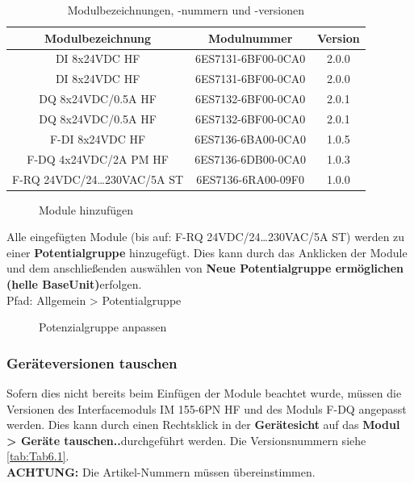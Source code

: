 \begin{table}[H]
    \centering
    \begin{tabular}{|c|c|c|}
        \hline
         \textbf{Modulbezeichnung} & \textbf{Modulnummer} & \textbf{Version} \\
         \hline
         DI 8x24VDC HF	& 6ES7131-6BF00-0CA0	& 2.0.0 \\
         \hline
         DI 8x24VDC HF	& 6ES7131-6BF00-0CA0	& 2.0.0 \\
         \hline
         DQ 8x24VDC/0.5A HF &	6ES7132-6BF00-0CA0	& 2.0.1 \\
         \hline
         DQ 8x24VDC/0.5A HF &	6ES7132-6BF00-0CA0	& 2.0.1 \\
         \hline
         F-DI 8x24VDC HF & 	6ES7136-6BA00-0CA0	& 1.0.5 \\
         \hline
         F-DQ 4x24VDC/2A PM HF & 	6ES7136-6DB00-0CA0	& 1.0.3 \\
         \hline
         F-RQ 24VDC/24…230VAC/5A ST & 	6ES7136-6RA00-09F0	& 1.0.0 \\
         \hline
    \end{tabular}
    \caption{Modulbezeichnungen, -nummern und -versionen}
    \label{tab:Tab6.1}
\end{table}

\begin{figure}[H]
   \centering
   \caption[Module hinzufügen]{Module hinzufügen}
   \label{fig:Bild6.23}
\end{figure}

Alle eingefügten Module (bis auf: F-RQ 24VDC/24…230VAC/5A ST) werden zu einer \textbf{Potentialgruppe} hinzugefügt. Dies kann durch das Anklicken der Module und dem anschließenden auswählen von \glqq\textbf{Neue Potentialgruppe ermöglichen (helle BaseUnit)}\grqq\:erfolgen.\\
Pfad: Allgemein > Potentialgruppe

\begin{figure}[H]
   \centering
   \caption[Potenzialgruppe anpassen]{Potenzialgruppe anpassen}
   \label{fig:Bild6.24}
\end{figure}

\subsubsection{Geräteversionen tauschen}
Sofern dies nicht bereits beim Einfügen der Module beachtet wurde, müssen die Versionen des Interfacemoduls IM 155-6PN HF und des Moduls F-DQ angepasst werden. Dies kann durch einen Rechtsklick in der \textbf{Gerätesicht} auf das \glqq\textbf{Modul > Geräte tauschen..}\grqq\:durchgeführt werden. Die Versionsnummern siehe \autoref{tab:Tab6.1}. \\
\textbf{ACHTUNG:} Die Artikel-Nummern müssen übereinstimmen.

